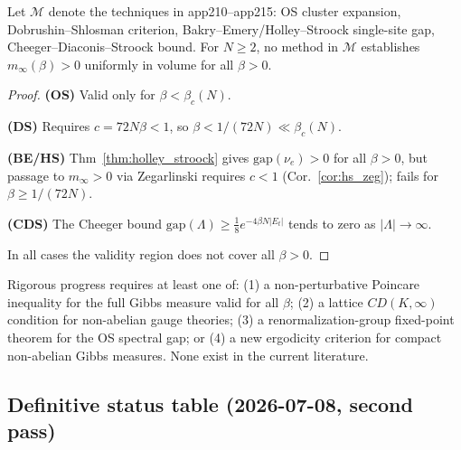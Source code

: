 \begin{theorem}
\label{thm:why_open}
Let $\mathcal{M}$ denote the techniques in app210--app215:
OS cluster expansion, Dobrushin--Shlosman criterion,
Bakry--Emery/Holley--Stroock single-site gap, Cheeger--Diaconis--Stroock bound.
For $N\ge 2$, no method in $\mathcal{M}$ establishes
$m_\infty(\beta)>0$ uniformly in volume for all $\beta>0$.
\end{theorem}
\begin{proof}
\textbf{(OS)} Valid only for $\beta<\beta_c(N)$.

\textbf{(DS)} Requires $c=72N\beta<1$, so $\beta<1/(72N)\ll\beta_c(N)$.

\textbf{(BE/HS)} Thm~\ref{thm:holley_stroock} gives $\mathrm{gap}(\nu_e)>0$
for all $\beta>0$, but passage to $m_\infty>0$ via Zegarlinski requires $c<1$
(Cor.~\ref{cor:hs_zeg}); fails for $\beta\ge 1/(72N)$.

\textbf{(CDS)} The Cheeger bound $\mathrm{gap}(\Lambda)\ge\frac{1}{8}e^{-4\beta N|E_t|}$
tends to zero as $|\Lambda|\to\infty$.

In all cases the validity region does not cover all $\beta>0$.
\end{proof}

\begin{remark}
Rigorous progress requires at least one of:
(1) a non-perturbative Poincare inequality for the full Gibbs measure valid for all $\beta$;
(2) a lattice $CD(K,\infty)$ condition for non-abelian gauge theories;
(3) a renormalization-group fixed-point theorem for the OS spectral gap; or
(4) a new ergodicity criterion for compact non-abelian Gibbs measures.
None exist in the current literature.
\end{remark}

\subsection{Definitive status table (2026-07-08, second pass)}


